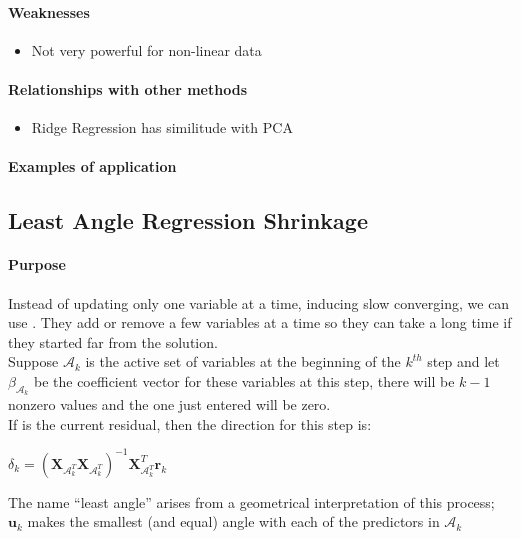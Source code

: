 \paragraph{Weaknesses}
\begin{itemize}
    \item Not very powerful for non-linear data

\end{itemize}

\paragraph{Relationships with other methods}
\begin{itemize}
    \item Ridge Regression has similitude with PCA
\end{itemize}

\paragraph{Examples of application}


\subsection{Least Angle Regression Shrinkage}
\paragraph{Purpose}
Instead of updating only one variable at a time, inducing slow converging, we can use . They add or remove a few variables at
a time so they can take a long time if they started far from the solution.\\
Suppose $\mathcal{A}_{k}$ is the active set of variables at the 
beginning of the $k^{th}$ step and let $\beta_{\mathcal{A}_{k}}$ be the
coefficient vector for these variables at this step, there will be 
$k-1$ nonzero values and the one just entered will be zero.\\
If 
is the current residual, then the direction for this step is:
\begin{center}
	$\delta_{k}=(\bm{X}_{\mathcal{A}_{k}^{T}}\bm{X}_{\mathcal{A}_{k}^{T}})^{-1}\bm{X}_{\mathcal{A}_{k}^{T}}^{T}\bm{r}_{k}$
\end{center}
The name ``least angle'' arises from a geometrical interpretation of 
this process; $\bm{u}_{k}$ makes the smallest (and equal) angle with
each of the predictors in $\mathcal{A}_{k}$
